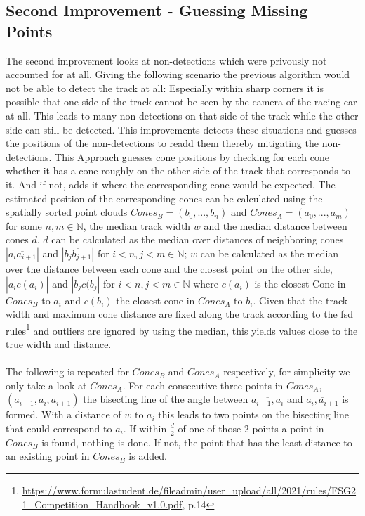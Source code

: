 \subsection{Second Improvement - Guessing Missing Points}
The second improvement looks at non-detections which were privously not accounted for at all. Giving the following scenario the previous algorithm would not be able to detect the track at all: Especially within sharp corners it is possible that one side of the track cannot be seen by the camera of the racing car at all. This leads to many non-detections on that side of the track while the other side can still be detected. This improvements detects these situations and guesses the positions of the non-detections to readd them thereby mitigating the non-detections.
This Approach guesses cone positions by checking for each cone whether it has a cone roughly on the other side of the track that corresponds to it. And if not, adds it where the corresponding cone would be expected. The estimated position of the corresponding cones can be calculated using the spatially sorted point clouds $Cones_B = (b_0,...,b_n)$ and $Cones_A = (a_0,...,a_m)$ for some $n,m \in \mathbb{N}$, the median track width $w$ and the median distance between cones $d$. $d$ can be calculated as the median over distances of neighboring cones $|\overline{a_i a_{i+1}}|$ and $|\overline{b_j b_{j+1}}|$ for $i<n,j<m \in \mathbb{N}$; $w$ can be calculated as the median over the distance between each cone and the closest point on the other side, $|\overline{a_i c(a_{i})}|$ and $|\overline{b_j c(b_{j}}|$ for $i<n,j<m \in \mathbb{N}$ where $c(a_i)$ is the closest Cone in $Cones_B$ to $a_i$ and $c(b_i)$ the closest cone in $Cones_A$ to $b_i$. Given that the track width and maximum cone distance are fixed along the track according to the \ac{fsd} rules\footnote{\url{https://www.formulastudent.de/fileadmin/user_upload/all/2021/rules/FSG21_Competition_Handbook_v1.0.pdf}, p.14} and outliers are ignored by using the median, this yields values close to the true width and distance.\\
\\The following is repeated for $Cones_B$ and $Cones_A$ respectively, for simplicity we only take a look at $Cones_A$. For each consecutive three points in $Cones_A$, $(a_{i-1},a_{i},a_{i+1})$ the bisecting line of the angle between $\overline{a_{i-1},a_{i}}$ and $\overline{a_{i},a_{i+1}}$ is formed. With a distance of $w$ to $a_{i}$ this leads to two points on the bisecting line that could correspond to  $a_{i}$. If within $\frac{d}{2}$ of one of those 2 points a point in $Cones_B$ is found, nothing is done. If not,  the point that has the least distance to an existing point in $Cones_B$ is added. \\
